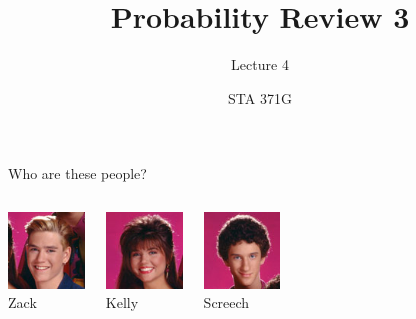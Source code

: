 \documentclass{beamer}\usepackage[]{graphicx}\usepackage[]{color}
\title{Probability Review 3}
\subtitle{Lecture 4}
\author{STA 371G}
\begin{document}
  
  

  \frame{\maketitle}



  \begin{darkframes}

    \begin{frame}{Who are these people?}
      \begin{columns}[onlytextwidth]
          \begin{center}
            \includegraphics[width=0.8in]{zack} \\
            Zack
          \end{center}
          \begin{center}
            \includegraphics[width=0.8in]{kelly} \\
            Kelly
          \end{center}
          \begin{center}
            \includegraphics[width=0.8in]{screech} \\
            Screech
          \end{center}
      \end{columns}
      \smallskip
      \begin{columns}[onlytextwidth]

\end{columns}
\end{frame}
\end{darkframes}
\end{document}

